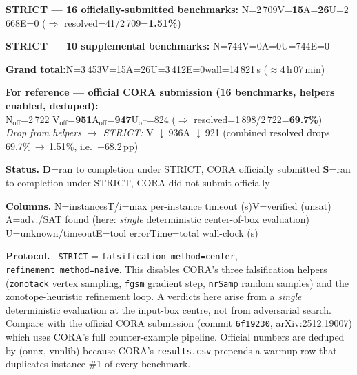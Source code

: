 \documentclass[10pt]{beamer}
\newcommand{\sdone}{{\color{cdone}\textbf{D}}}
\newcommand{\snotsub}{{\color{csup}\textbf{S}}}
\begin{document}
\begin{frame}[fragile]
\vspace{0.4em}
\centering\scriptsize
\textbf{STRICT --- 16 officially-submitted benchmarks:}\quad
N=2\,709\quad V=\textbf{15}\quad A=\textbf{26}\quad U=2\,668\quad E=0\quad
($\Rightarrow$ resolved=41/2\,709=\textbf{1.51\%})

\textbf{STRICT --- 10 supplemental benchmarks:}\quad
N=744\quad V=0\quad A=0\quad U=744\quad E=0

\textbf{Grand total:}\quad N=3\,453\quad V=15\quad A=26\quad U=3\,412\quad E=0\quad wall=14\,821\,s ($\approx$4\,h\,07\,min)

\vspace{0.3em}
\centering\scriptsize
\textbf{For reference --- official CORA submission (16 benchmarks, helpers enabled, deduped):}\\
N$_{\text{off}}$=2\,722\quad
V$_{\text{off}}$=\textbf{951}\quad A$_{\text{off}}$=\textbf{947}\quad U$_{\text{off}}$=824\quad
($\Rightarrow$ resolved=1\,898/2\,722=\textbf{69.7\%})\\
\textit{Drop from helpers $\to$ STRICT:}\;
V $\downarrow$\,936\quad A $\downarrow$\,921\quad
(combined resolved drops 69.7\%\,$\to$\,1.51\%, i.e.\ $-68.2$\,pp)

\vspace{0.3em}
\centering\scriptsize
\textbf{Status.}\;
\sdone{}=ran to completion under STRICT, CORA officially submitted\quad
\snotsub{}=ran to completion under STRICT, CORA did not submit officially

\vspace{0.2em}
\centering\scriptsize
\textbf{Columns.}\;
N=instances\quad T/i=max per-instance timeout (s)\quad V=verified (unsat)\quad
A=adv./SAT found (here: \emph{single} deterministic center-of-box evaluation)\quad
U=unknown/timeout\quad E=tool error\quad Time=total wall-clock (s)

\vspace{0.2em}
\centering\scriptsize
\textbf{Protocol.}\;
\texttt{--STRICT} = \texttt{falsification\_method=center}, \texttt{refinement\_method=naive}.
This disables CORA's three falsification helpers (\texttt{zonotack} vertex sampling,
\texttt{fgsm} gradient step, \texttt{nrSamp} random samples) and the
zonotope-heuristic refinement loop. A verdicts here arise from a \emph{single}
deterministic evaluation at the input-box centre, not from adversarial search.
Compare with the official CORA submission (commit \texttt{6f19230},
arXiv:2512.19007) which uses CORA's full counter-example pipeline. Official
numbers are deduped by (onnx, vnnlib) because CORA's \texttt{results.csv}
prepends a warmup row that duplicates instance \#1 of every benchmark.

\end{frame}
\end{document}
